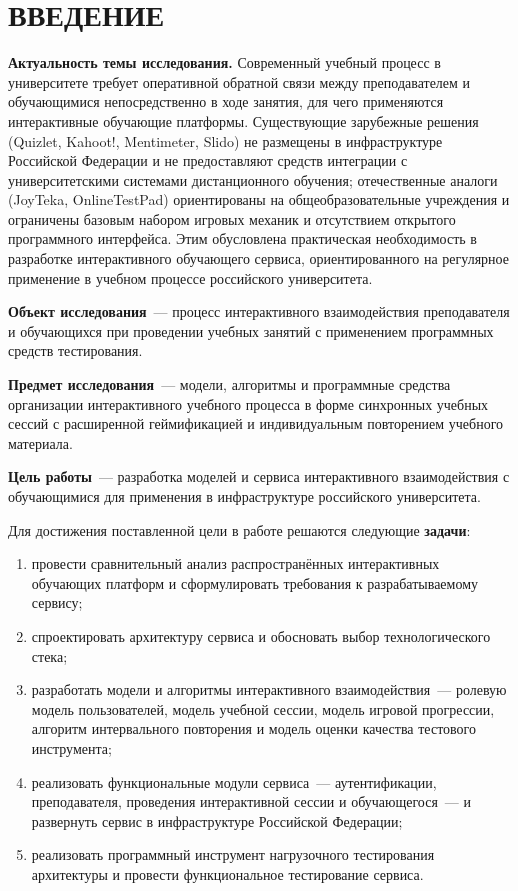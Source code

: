 \section*{ВВЕДЕНИЕ}
\thispagestyle{plain}

\textbf{Актуальность темы исследования.}
Современный учебный процесс в университете требует
оперативной обратной связи между преподавателем и обучающимися
непосредственно в ходе занятия, для чего применяются интерактивные
обучающие платформы. Существующие зарубежные решения (Quizlet,
Kahoot!, Mentimeter, Slido) не размещены в инфраструктуре
Российской Федерации и не предоставляют средств интеграции
с университетскими системами дистанционного обучения; отечественные
аналоги (JoyTeka, OnlineTestPad) ориентированы на общеобразовательные
учреждения и ограничены базовым набором игровых механик и
отсутствием открытого программного интерфейса. Этим обусловлена
практическая необходимость в разработке интерактивного обучающего
сервиса, ориентированного на регулярное применение в учебном
процессе российского университета.

\textbf{Объект исследования}~--- процесс интерактивного взаимодействия
преподавателя и обучающихся при проведении учебных занятий
с применением программных средств тестирования.

\textbf{Предмет исследования}~--- модели, алгоритмы и программные
средства организации интерактивного учебного процесса в форме
синхронных учебных сессий с расширенной геймификацией
и индивидуальным повторением учебного материала.

\textbf{Цель работы}~--- разработка моделей и сервиса
интерактивного взаимодействия с обучающимися для применения
в инфраструктуре российского университета.

Для достижения поставленной цели в работе решаются следующие
\textbf{задачи}:
\begin{enumerate}
    \item провести сравнительный анализ распространённых интерактивных
          обучающих платформ и сформулировать требования к разрабатываемому
          сервису;
    \item спроектировать архитектуру сервиса и обосновать выбор
          технологического стека;
    \item разработать модели и алгоритмы интерактивного
          взаимодействия~--- ролевую модель пользователей, модель
          учебной сессии, модель игровой прогрессии, алгоритм
          интервального повторения и модель оценки качества
          тестового инструмента;
    \item реализовать функциональные модули сервиса~--- аутентификации,
          преподавателя, проведения интерактивной сессии и обучающегося~---
          и развернуть сервис в инфраструктуре Российской Федерации;
    \item реализовать программный инструмент нагрузочного тестирования
          архитектуры и провести функциональное тестирование сервиса.
\end{enumerate}

